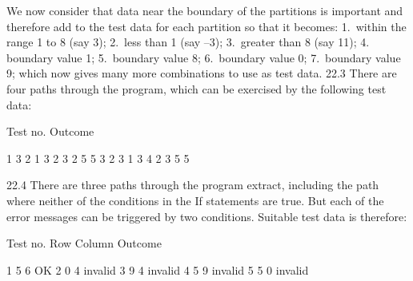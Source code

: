 	We now consider that data near the boundary of the partitions is important and therefore add to the test data for each partition so that it becomes:
	1. within the range 1 to 8 (say 3);
	2. less than 1 (say –3);
	3. greater than 8 (say 11);
	4. boundary value 1;
	5. boundary value 8;
	6. boundary value 0;
	7. boundary value 9;
	which now gives many more combinations to use as test data.
22.3	There are four paths through the program, which can be exercised by the following test data:

Test no.	Outcome

1	3	2	1	3
2	3	2	5	5
3	2	3	1	3
4	2	3	5	5



22.4	There are three paths through the program extract, including the path where neither of the conditions in the If statements are true. But each of the error messages can be triggered by two conditions. Suitable test data is therefore:

Test no.	Row	Column	Outcome

1	5	6	OK
2	0	4	invalid
3	9	4	invalid
4	5	9	invalid
5	5	0	invalid
 

